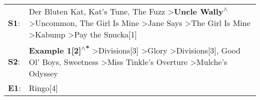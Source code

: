 \begin{supertabular}{p{0.03\textwidth}p{0.92\textwidth}}
 \textbf{S1}:  &  Der Bluten Kat\textsuperscript{}, \enspace Kat's Tune\textsuperscript{}, \enspace The Fuzz\textsuperscript{} \textgreater \enspace \textbf{Uncle Wally\textsuperscript{$\wedge$}} \textgreater \enspace Uncommon\textsuperscript{}, \enspace The Girl Is Mine\textsuperscript{} \textgreater \enspace Jane Says\textsuperscript{} \textgreater \enspace The Girl Is Mine\textsuperscript{} \textgreater \enspace Kabump\textsuperscript{} \textgreater \enspace Pay the Snucka[1]\textsuperscript{}  \enspace  \\
 \textbf{S2}:  &                                                                                     \textbf{Example 1[2]\textsuperscript{$\wedge$*}} \textgreater \enspace Divisions[3]\textsuperscript{} \textgreater \enspace Glory\textsuperscript{} \textgreater \enspace Divisions[3]\textsuperscript{}, \enspace Good Ol' Boys\textsuperscript{}, \enspace Sweetness\textsuperscript{} \textgreater \enspace Miss Tinkle's Overture\textsuperscript{} \textgreater \enspace Mulche's Odyssey\textsuperscript{}  \enspace  \\
 \textbf{E1}:  &                                                                                                                                                                                                                                                                                                                                                                                                                                                                           Ringo[4]\textsuperscript{}  \enspace  \\
\end{supertabular}
